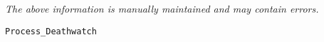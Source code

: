 \label{pkg:process\_deathwatch}

{\tiny \it The above information is manually maintained and may contain errors.}
\begin{verbatim}
Process_Deathwatch
\end{verbatim}
